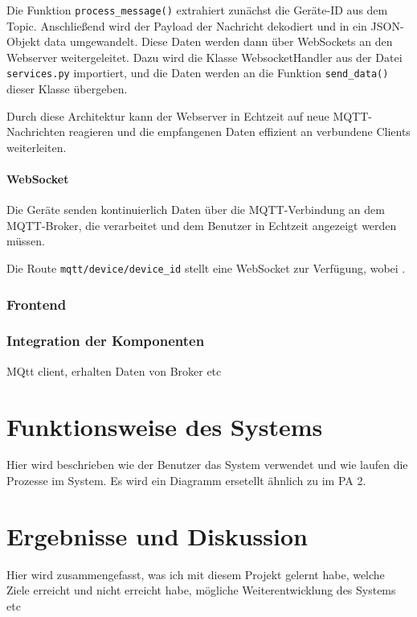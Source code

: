 \documentclass[12pt, letterpaper]{article}
\begin{document}
  \par Die Funktion \texttt{process\_message()} extrahiert zunächst die Geräte-ID aus dem Topic. Anschließend wird der Payload der Nachricht dekodiert und in ein JSON-Objekt data umgewandelt. Diese Daten werden dann über WebSockets an den Webserver weitergeleitet. Dazu wird die Klasse WebsocketHandler aus der Datei \texttt{services.py} importiert, und die Daten werden an die Funktion \texttt{send\_data()} dieser Klasse übergeben.
  \par Durch diese Architektur kann der Webserver in Echtzeit auf neue MQTT-Nachrichten reagieren und die empfangenen Daten effizient an verbundene Clients weiterleiten.
  \paragraph{WebSocket}
  \par \textbf{}
  \par Die Geräte senden kontinuierlich Daten über die MQTT-Verbindung an dem MQTT-Broker, die verarbeitet und dem Benutzer in Echtzeit angezeigt werden müssen.  
  \par Die Route \texttt{mqtt/device/device\_id} stellt eine WebSocket zur Verfügung, wobei .

  \subsubsection{Frontend}
  \subsubsection{Integration der Komponenten}
  \par MQtt client, erhalten Daten von Broker etc

\newpage
\section{Funktionsweise des Systems}
\par Hier wird beschrieben wie der Benutzer das System verwendet und wie laufen die Prozesse im System. Es wird ein Diagramm ersetellt ähnlich zu im PA 2. 
\section{Ergebnisse und Diskussion}
\par Hier wird zusammengefasst, was ich mit diesem Projekt gelernt habe, welche Ziele erreicht und nicht erreicht habe, mögliche Weiterentwicklung des Systems etc
\newpage
\end{document}
